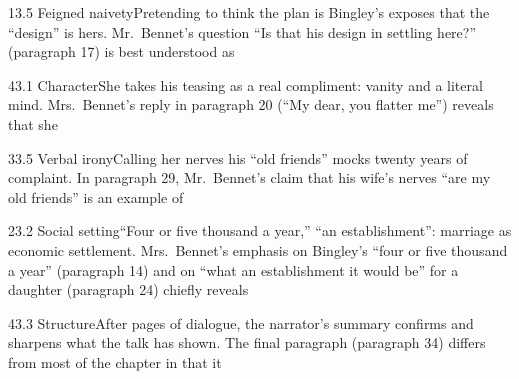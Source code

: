\documentclass[11pt]{article}
\begin{document}
\begin{q}{1}{3.5 Feigned naivety}{Pretending to think the plan is Bingley's exposes that the ``design'' is hers.}
Mr.\ Bennet's question ``Is that his design in settling here?'' (paragraph 17) is best understood as
\end{q}

\begin{q}{4}{3.1 Character}{She takes his teasing as a real compliment: vanity and a literal mind.}
Mrs.\ Bennet's reply in paragraph 20 (``My dear, you flatter me'') reveals that she
\end{q}

\begin{q}{3}{3.5 Verbal irony}{Calling her nerves his ``old friends'' mocks twenty years of complaint.}
In paragraph 29, Mr.\ Bennet's claim that his wife's nerves ``are my old friends'' is an example of
\end{q}

\begin{q}{2}{3.2 Social setting}{``Four or five thousand a year,'' ``an establishment'': marriage as economic settlement.}
Mrs.\ Bennet's emphasis on Bingley's ``four or five thousand a year'' (paragraph 14) and on ``what an establishment it would be'' for a daughter (paragraph 24) chiefly reveals
\end{q}

\begin{q}{4}{3.3 Structure}{After pages of dialogue, the narrator's summary confirms and sharpens what the talk has shown.}
The final paragraph (paragraph 34) differs from most of the chapter in that it
\end{q}
\end{document}

